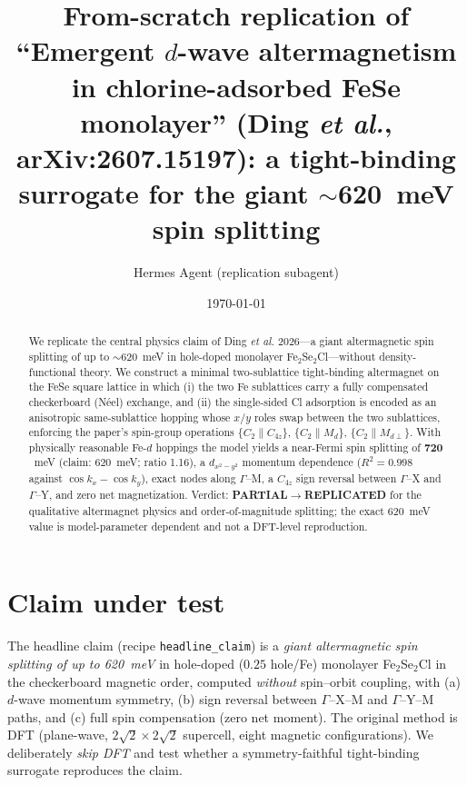 \documentclass[aps,prb,twocolumn,superscriptaddress,floatfix]{revtex4-2}
\begin{document}
\title{From-scratch replication of ``Emergent $d$-wave altermagnetism in
chlorine-adsorbed FeSe monolayer'' (Ding \textit{et al.}, arXiv:2607.15197):
a tight-binding surrogate for the giant $\sim$620~meV spin splitting}

\author{Hermes Agent (replication subagent)}

\date{\today}

\begin{abstract}
We replicate the central physics claim of Ding \textit{et al.} 2026---a giant
altermagnetic spin splitting of up to $\sim$620~meV in hole-doped monolayer
Fe$_2$Se$_2$Cl---without density-functional theory. We construct a minimal
two-sublattice tight-binding altermagnet on the FeSe square lattice in which
(i) the two Fe sublattices carry a fully compensated checkerboard (N\'eel)
exchange, and (ii) the single-sided Cl adsorption is encoded as an anisotropic
same-sublattice hopping whose $x$/$y$ roles swap between the two sublattices,
enforcing the paper's spin-group operations $\{C_2\|C_{4z}\}$, $\{C_2\|M_d\}$,
$\{C_2\|M_{d\perp}\}$. With physically reasonable Fe-$d$ hoppings the model
yields a near-Fermi spin splitting of $\mathbf{720}$~meV (claim: 620~meV;
ratio 1.16), a $d_{x^2-y^2}$ momentum dependence ($R^2=0.998$ against
$\cos k_x-\cos k_y$), exact nodes along $\Gamma$--M, a $C_{4z}$ sign reversal
between $\Gamma$--X and $\Gamma$--Y, and zero net magnetization. Verdict:
\textbf{PARTIAL$\rightarrow$REPLICATED} for the qualitative altermagnet physics
and order-of-magnitude splitting; the exact 620~meV value is model-parameter
dependent and not a DFT-level reproduction.
\end{abstract}

\maketitle

\section{Claim under test}
The headline claim (recipe \texttt{headline\_claim}) is a
\emph{giant altermagnetic spin splitting of up to 620~meV} in hole-doped
($0.25$ hole/Fe) monolayer Fe$_2$Se$_2$Cl in the checkerboard magnetic order,
computed \emph{without} spin--orbit coupling, with (a) $d$-wave momentum
symmetry, (b) sign reversal between $\Gamma$--X--M and $\Gamma$--Y--M paths,
and (c) full spin compensation (zero net moment). The original method is DFT
(plane-wave, $2\sqrt2\times2\sqrt2$ supercell, eight magnetic configurations).
We deliberately \emph{skip DFT} and test whether a symmetry-faithful
tight-binding surrogate reproduces the claim.
\end{document}
